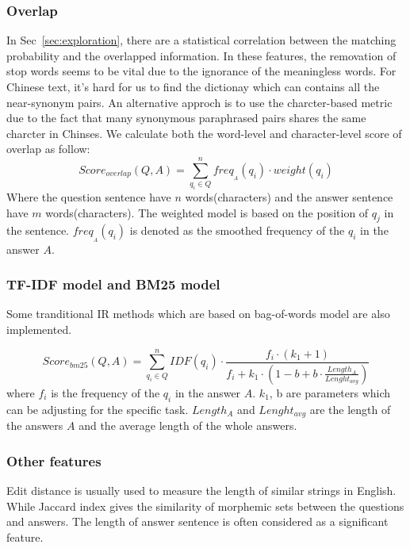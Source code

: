 \documentclass{llncs}
\begin{document}
\subsubsection{Overlap}
In Sec~\ref{sec:exploration}, there are a statistical correlation between the matching probability and the overlapped information. 
In these features, the removation of stop words seems to be vital due to the ignorance of the meaningless words. For Chinese text, it's hard for us to find the dictionay which can contains all the near-synonym pairs. An alternative approch is to use the charcter-based metric due to the fact that many synonymous paraphrased pairs shares the same charcter in Chinses. We calculate both the word-level and character-level score of overlap as follow:
\begin{equation}
Score_{overlap}(Q,A)=\sum_{q_i \in Q}^n freq_{_A}(q_i)\cdot weight(q_i)  
\label{eq:overlap}
\end{equation}
Where the question sentence have $n$ words(characters) and the answer sentence have $m$ words(characters). The weighted model is based on the position of $q_j$ in the sentence. %
$freq_{_A}(q_i)$ is denoted as the smoothed frequency of the $q_i$ in the answer $A$.
\subsubsection{TF-IDF model and BM25 model}
Some tranditional IR methods which are based on bag-of-words model are also implemented.

\begin{equation}
Score_{bm25}(Q,A)=\sum_{q_i \in Q}^nIDF(q_i)\cdot \frac{f_i\cdot(k_1+1)}{f_i + k_1 \cdot (1-b +b\cdot \frac{Length_A}{Lenght_{avg}})}  
\label{eq:bm25}
\end{equation}
where $f_i$ is the frequency of the $q_i$ in the answer $A$. $k_1$, b are parameters which can be adjusting for the specific task. $Length_A$ and $Lenght_{avg}$ are the length of the answers $A$ and the average length of the whole answers.
\subsubsection{Other features}
Edit distance is usually used to measure the length of similar strings in English. While Jaccard index gives the similarity of morphemic sets between the questions and answers. The length of answer sentence is often considered as a significant feature.
\end{document}
